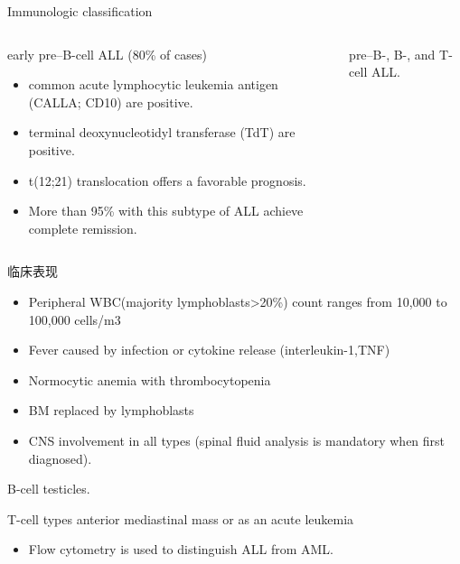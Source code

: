 \documentclass[
  ignorenonframetext,
]{beamer}
\providecommand{\tightlist}{%
  \setlength{\itemsep}{0pt}\setlength{\parskip}{0pt}}
\begin{document}
\begin{frame}
\begin{block}{Immunologic classification}
\protect\hypertarget{immunologic-classification}{}
\end{block}

\begin{columns}[T]
\begin{column}{0.5\textwidth}
\begin{block}{early pre--B-cell ALL (80\% of cases)}
\protect\hypertarget{early-preb-cell-all-80-of-cases}{}
\begin{itemize}
\item
  common acute lymphocytic leukemia antigen (CALLA; CD10) are positive.
\item
  terminal deoxynucleotidyl transferase (TdT) are positive.
\item
  t(12;21) translocation offers a favorable prognosis.
\item
  More than 95\% with this subtype of ALL achieve complete remission.
\end{itemize}
\end{block}
\end{column}

\begin{column}{0.5\textwidth}
\begin{block}{pre--B-, B-, and T-cell ALL.}
\protect\hypertarget{preb--b--and-t-cell-all.}{}
\end{block}
\end{column}
\end{columns}
\end{frame}

\begin{frame}
\begin{block}{临床表现}
\protect\hypertarget{ux4e34ux5e8aux8868ux73b0-6}{}
\begin{itemize}
\item
  Peripheral WBC(majority lymphoblasts\textgreater20\%) count ranges
  from 10,000 to 100,000 cells/m3
\item
  Fever caused by infection or cytokine release (interleukin-1,TNF)
\item
  Normocytic anemia with thrombocytopenia
\item
  BM replaced by lymphoblasts
\item
  CNS involvement in all types (spinal fluid analysis is mandatory when
  first diagnosed).
\end{itemize}

B-cell testicles.

T-cell types anterior mediastinal mass or as an acute leukemia

\begin{itemize}
\tightlist
\item
  Flow cytometry is used to distinguish ALL from AML.
\end{itemize}
\end{block}
\end{frame}
\end{document}
